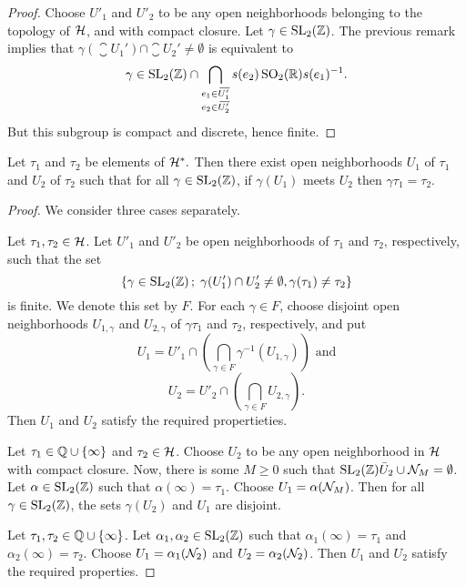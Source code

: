 \begin{proof}
 Choose $U'_1$ and $U'_2$ to be any open neighborhoods belonging to the topology of $\mathcal{H}$, and with compact closure. Let $\gamma\in\operatorname{SL}_2(\mathbb{Z})$. The previous remark implies that $\gamma(\closure{U_1'})\cap\closure{U_2'}\neq\emptyset$ is equivalent to \[\gamma \in \operatorname{SL}_2(\mathbb{Z}) \cap \bigcap_{\substack{e_1\in{}\mkern3mu\overline{\mkern-3muU_1'}\\e_2\in{}\mkern3mu\overline{\mkern-3muU_2'}}}s(e_2)\operatorname{SO}_2(\mathbb{R})s(e_1)^{-1}.\] But this subgroup is compact and discrete, hence finite.
\end{proof}

\begin{prop}
 Let $\tau_1$ and $\tau_2$ be elements of $\mathcal{H}^*.$ Then there exist open neighborhoods $U_1$ of $\tau_1$ and $U_2$ of $\tau_2$ such that for all $\gamma\in\operatorname{SL}_2(\mathbb{Z})$, if $\gamma(U_1)$ meets $U_2$ then $\gamma\tau_1 = \tau_2$.
\end{prop}

\begin{proof}
 We consider three cases separately.
 
  Let $\tau_1,\tau_2\in\mathcal{H}$. Let $U'_1$ and $U'_2$ be open neighborhoods of $\tau_1$ and $\tau_2$, respectively, such that the set
 \[\{\gamma\in\operatorname{SL}_2(\mathbb{Z})\,;\; \gamma(U'_1)\cap U'_2\neq\emptyset, \gamma(\tau_1)\neq \tau_2\}\]
 is finite. We denote this set by $F$. For each $\gamma\in F$, choose disjoint open neighborhoods $U_{1,\gamma}$ and $U_{2,\gamma}$ of $\gamma\tau_1$ and $\tau_2$, respectively, and put
 \[U_1 = U'_1\cap\left(\bigcap_{\gamma\in F}\gamma^{-1}(U_{1,\gamma})\right)\text{ and}\]
 \[U_2 = U'_2\cap\left(\bigcap_{\gamma\in F}U_{2,\gamma}\right).\]
 Then $U_1$ and $U_2$ satisfy the required propertieties.
 
  Let $\tau_1\in\mathbb{Q}\cup\{\infty\}$ and $\tau_2\in\mathcal{H}$. Choose $U_2$ to be any open neighborhood in $\mathcal{H}$ with compact closure. Now, there is some $M\geq 0$ such that $\operatorname{SL}_2(\mathbb{Z})\bar{U}_2\cup\mathcal{N}_M=\emptyset$. Let $\alpha\in\operatorname{SL}_2(\mathbb{Z})$ such that $\alpha(\infty)=\tau_1$. Choose $U_1=\alpha(\mathcal{N}_M)$. Then for all $\gamma\in\operatorname{SL}_2(\mathbb{Z})$, the sets $\gamma(U_2)$ and $U_1$ are disjoint.
 
  Let $\tau_1,\tau_2\in\mathbb{Q}\cup\{\infty\}$. Let $\alpha_1,\alpha_2\in\operatorname{SL}_2(\mathbb{Z})$ such that $\alpha_1(\infty)=\tau_1$ and $\alpha_2(\infty)=\tau_2$. Choose $U_1=\alpha_1(\mathcal{N}_2)$ and $U_2=\alpha_2(\mathcal{N}_2)$. Then $U_1$ and $U_2$ satisfy the required properties.
\end{proof}

